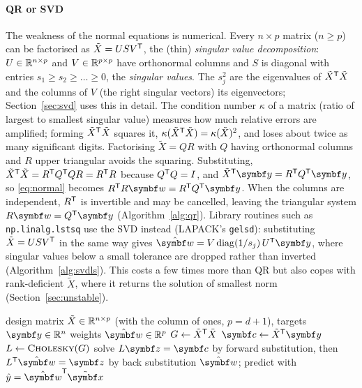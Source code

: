 \documentclass[11pt]{article}
\newcommand{\Xt}{\tilde X}
\newcommand{\xt}{\tilde{\x}}
\newcommand{\w}{\vect{w}}
\newcommand{\y}{\vect{y}}
\begin{document}
\paragraph{QR or SVD} The weakness of the normal equations is numerical. Every $n \times p$ matrix ($n \ge p$) can be
factorised as $\Xt = USV\T$, the (thin) \emph{singular value decomposition}: $U \in \mathbb{R}^{n \times p}$ and
$V \in \mathbb{R}^{p \times p}$ have orthonormal columns and $S$ is diagonal with entries $s_1 \ge s_2 \ge \dots \ge 0$, the
\emph{singular values}. The $s_j^2$ are the eigenvalues of $\Xt\T\Xt$ and the columns of $V$ (the right singular
vectors) its eigenvectors; Section~\ref{sec:svd} uses this in detail. The condition number $\kappa$ of a matrix (ratio
of largest to smallest singular value) measures how much relative errors are amplified; forming $\Xt\T\Xt$ squares it,
$\kappa(\Xt\T\Xt) = \kappa(\Xt)^2$, and loses about twice as many significant digits. Factorising $\Xt = QR$ with $Q$
having orthonormal columns and $R$ upper triangular avoids the squaring. Substituting, $\Xt\T\Xt = R\T Q\T Q R = R\T R$
because $Q^{\mathsf{T}} Q = I$, and $\Xt\T\y = R\T Q\T\y$, so \eqref{eq:normal} becomes $R\T R\w = R\T Q\T\y$. When the columns
are independent, $R^{\mathsf{T}}$ is invertible and may be cancelled, leaving the triangular system $R\w = Q\T\y$
(Algorithm~\ref{alg:qr}). Library routines such as \texttt{np.linalg.lstsq} use the SVD instead (LAPACK's
\texttt{gelsd}): substituting $\Xt = USV\T$ in the same way gives $\hat{\w} = V\,\mathrm{diag}(1/s_j)\,U\T\y$, where
singular values below a small tolerance are dropped rather than inverted (Algorithm~\ref{alg:svdls}). This costs a few
times more than QR but also copes with rank-deficient $\Xt$, where it returns the solution of smallest norm
(Section~\ref{sec:unstable}).

\begin{algorithm}[htbp]
\caption{Least squares by the normal equations (Cholesky)}
\label{alg:normal}
\begin{algorithmic}[1]
\Require design matrix $\Xt \in \R^{n \times p}$ (with the column of ones, $p = d+1$), targets $\y \in \R^n$
\Ensure weights $\hat{\w} \in \R^p$
\State $G \gets \Xt\T\Xt$ 
\State $\vect{c} \gets \Xt\T\y$ 
\State $L \gets \Call{Cholesky}{G}$ 
\State solve $L\vect{z} = \vect{c}$ by forward substitution, then $L\T\hat{\w} = \vect{z}$ by back substitution 
\State \Return $\hat{\w}$; predict with $\hat y = \hat{\w}\T\xt$
\end{algorithmic}
\end{algorithm}
\end{document}
